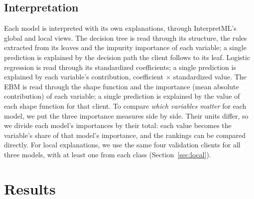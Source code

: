 \documentclass[a4paper,11pt]{article}
\begin{document}
\subsection{Interpretation}
Each model is interpreted with its own explanations, through InterpretML's global and local views. The decision tree is read through its structure, the rules extracted from its leaves and the impurity importance of each variable; a single prediction is explained by the decision path the client follows to its leaf. Logistic regression is read through its standardized coefficients; a single prediction is explained by each variable's contribution, coefficient $\times$ standardized value. The EBM is read through the shape function and the importance (mean absolute contribution) of each variable; a single prediction is explained by the value of each shape function for that client.
To compare \emph{which variables matter} for each model, we put the three importance measures side by side. Their units differ, so we divide each model's importances by their total: each value becomes the variable's share of that model's importance, and the rankings can be compared directly. For local explanations, we use the same four validation clients for all three models, with at least one from each class (Section~\ref{sec:local}).

\section{Results}
\end{document}
